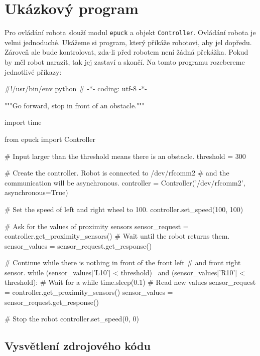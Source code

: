 \documentclass[12pt,notitlepage]{report}
\newenvironment{mylisting}{}{}
\begin{document}
\section{Ukázkový program}
\label{ukazkovy_program}

    Pro ovládání robota slouží modul {\tt epuck} a objekt {\tt Controller}.
    Ovládání robota je velmi jednoduché. Ukážeme si program, který přikáže
    robotovi, aby jel dopředu. Zároveň ale bude kontrolovat, zda-li před
    robotem není žádná překážka. Pokud by měl robot narazit, tak jej zastaví a
    skončí. Na tomto programu rozebereme jednotlivé příkazy:

\begin{mylisting}
\begin{pyc}
#!/usr/bin/env python
# -*- coding: utf-8 -*-

"""Go forward, stop in front of an obstacle."""

import time

from epuck import Controller

# Input larger than the threshold means there is an obstacle.
threshold = 300

# Create the controller. Robot is connected to /dev/rfcomm2
# and the communication will be asynchronous.
controller = Controller('/dev/rfcomm2', asynchronous=True)

# Set the speed of left and right wheel to 100.
controller.set_speed(100, 100)

# Ask for the values of proximity sensors
sensor_request = controller.get_proximity_sensors()
# Wait until the robot returns them.
sensor_values = sensor_request.get_response()

# Continue while there is nothing in front of the front left
# and front right sensor.
while (sensor_values['L10'] < threshold) \
       and (sensor_values['R10'] < threshold):
    # Wait for a while
    time.sleep(0.1)
    # Read new values
    sensor_request = controller.get_proximity_sensors()
    sensor_values = sensor_request.get_response()

# Stop the robot
controller.set_speed(0, 0)
\end{pyc}
\label{lst:simple_example}
\end{mylisting}

\subsection{Vysvětlení zdrojového kódu}
\end{document}
